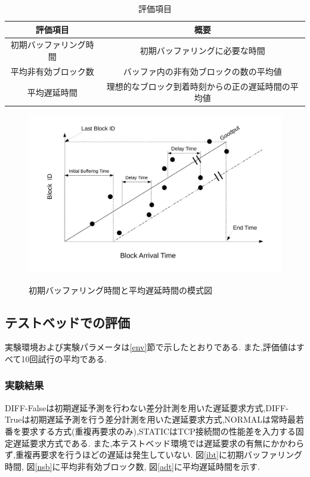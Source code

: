 \documentclass[a4j,12pt]{gradthesis_utf8}
\begin{document}
\newpage

\begin{table}[htb]
	\begin{center}
		\caption{評価項目}
		\label{hyoka}
		\begin{tabular}{|c|c|} \hline
			評価項目 & 概要　\\ \hline \hline
			初期バッファリング時間 & 初期バッファリングに必要な時間 \\ \hline
			平均非有効ブロック数 & バッファ内の非有効ブロックの数の平均値 \\ \hline
			平均遅延時間 & 理想的なブロック到着時刻からの正の遅延時間の平均値 \\ \hline
		\end{tabular}
	\end{center}
\end{table}

\begin{figure}[ht]
	\begin{center}
		\label{buf}
		\includegraphics[width=17cm]{figure/initialBuffering.pdf}
		\caption{初期バッファリング時間と平均遅延時間の模式図}
	\end{center}
\end{figure}

\clearpage

\subsection{テストベッドでの評価}
実験環境および実験パラメータは\ref{env}節で示したとおりである.
また,評価値はすべて10回試行の平均である.

\subsubsection{実験結果}
DIFF-Falseは初期遅延予測を行わない差分計測を用いた遅延要求方式,DIFF-Trueは初期遅延予測を行う差分計測を用いた遅延要求方式,NORMALは常時最若番を要求する方式(重複再要求のみ),STATICはTCP接続間の性能差を入力する固定遅延要求方式である.
また,本テストベッド環境では遅延要求の有無にかかわらず,重複再要求を行うほどの遅延は発生していない.
図\ref{ibt}に初期バッファリング時間,
図\ref{nsb}に平均非有効ブロック数,
図\ref{adt}に平均遅延時間を示す.
\end{document}
